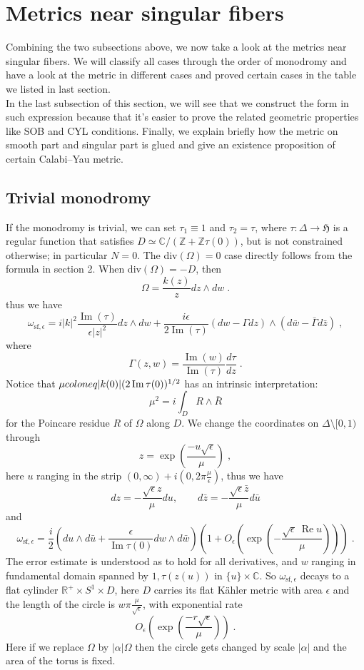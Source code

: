 
\section{Metrics near singular fibers}
Combining the two subsections above, we now take a look at the metrics near singular fibers. We will classify all cases through the order of monodromy and have a look at the metric in different cases and proved certain cases in the table we listed in last section.\\ \indent
In the last subsection of this section, we will see that we construct the form in such expression because that it's easier to prove the related geometric properties like SOB and CYL conditions. Finally, we explain briefly how the metric on smooth part and singular part is glued and give an existence proposition of certain Calabi--Yau metric.
\subsection{Trivial monodromy}
\indent If the monodromy is trivial, we can set $\tau_1\equiv 1$ and $\tau_2=\tau$, where $\tau\colon\Delta\rightarrow\mathfrak{H}$ is a regular function that satisfies $D\simeq \mathbb{C}/(\mathbb{Z}+\mathbb{Z}\tau(0))$, but is not constrained otherwise; in particular $N=0$. The div$(\Omega)=0$ case directly follows from the formula in section 2. When div$(\Omega)=-D$, then \[ \Omega=\frac{k(z)}{z}dz\wedge dw\; . \]
thus we have
\[ \omega_{\mathrm{sf},\epsilon}=i|k|^2\frac{\operatorname{Im}(\tau)}{\epsilon|z|^2}dz\wedge dw+\frac{i\epsilon}{2\operatorname{Im}(\tau)}(dw-\Gamma dz)\wedge(d\bar{w}-\bar{\Gamma}d\bar{z})\; , \]
where \[ \Gamma(z,w)=\frac{\operatorname{Im}(w)}{\operatorname{Im}(\tau)}\frac{d\tau}{dz}\; . \]
\indent Notice that $\mu\\coloneq|k(0)|(2\operatorname{Im}\tau(0))^{1/2}$ has an intrinsic interpretation:
\[ \mu^2=i\int_D R\wedge\bar{R} \]
for the Poincare residue $R$ of $\Omega$ along $D$. We change the coordinates on $\Delta\setminus[0,1)$ through
\[ z=\exp\left(\frac{-u\sqrt{\epsilon}}{\mu}\right)\; , \]
here $u$ ranging in the strip $(0,\infty)+i(0,2\pi\frac{\mu}{\epsilon})$, thus we have
\[ dz=-\frac{\sqrt{\epsilon}z}{\mu}du,\qquad d\bar{z}=-\frac{\sqrt{\epsilon}\bar{z}}{\mu}d\bar{u} \]
and
\[ \omega_{\mathrm{sf},\epsilon}=\frac{i}{2}\left(du\wedge d\bar{u}+\frac{\epsilon}{\operatorname{Im}\tau(0)}dw\wedge d\bar{w}\right)\left(1+O_\epsilon\left(\exp\left(-\frac{\sqrt{\epsilon}\:\operatorname{Re}u}{\mu} \right)\right)\right)\; . \]
\indent The error estimate is understood as to hold for all derivatives, and $w$ ranging in fundamental domain spanned by $1,\tau(z(u))$ in $\{u\}\times\mathbb{C}$. So $\omega_{\mathrm{sf},\epsilon}$ decays to a flat cylinder $\mathbb{R}^+\times S^1\times D$, here $D$ carries its flat K{\"a}hler metric with area $\epsilon$ and the length of the circle is $w\pi\frac{\mu}{\sqrt{\epsilon}}$, with exponential rate \[ O_\epsilon\left(\exp\left(\frac{-r\sqrt{\epsilon}}{\mu}\right)\right)\; . \]
\indent Here if we replace $\Omega$ by $|\alpha|\Omega$ then the circle gets changed by scale $|\alpha|$ and the area of the torus is fixed.\\ \indent
